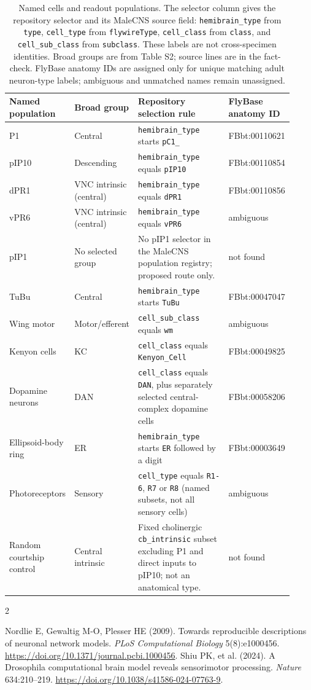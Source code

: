 \documentclass[11pt]{article}
\begin{document}
\clearpage
\begin{table}[htbp]
\caption{Named cells and readout populations. The selector column gives the repository selector and its MaleCNS source field: \texttt{hemibrain\_type} from \texttt{type}, \texttt{cell\_type} from \texttt{flywireType}, \texttt{cell\_class} from \texttt{class}, and \texttt{cell\_sub\_class} from \texttt{subclass}. These labels are not cross-specimen identities. Broad groups are from Table S2; source lines are in the fact-check. FlyBase anatomy IDs are assigned only for unique matching adult neuron-type labels; ambiguous and unmatched names remain unassigned.}
\small\begin{tabular}{@{}p{0.17\linewidth}p{0.22\linewidth}p{0.38\linewidth}p{0.15\linewidth}@{}}\toprule
Named population & Broad group & Repository selection rule & FlyBase anatomy ID \\ \midrule
P1 & Central & \texttt{hemibrain\_type} starts \texttt{pC1\_} & FBbt:00110621 \\
pIP10 & Descending & \texttt{hemibrain\_type} equals \texttt{pIP10} & FBbt:00110854 \\
dPR1 & VNC intrinsic (central) & \texttt{hemibrain\_type} equals \texttt{dPR1} & FBbt:00110856 \\
vPR6 & VNC intrinsic (central) & \texttt{hemibrain\_type} equals \texttt{vPR6} & ambiguous \\
pIP1 & No selected group & No pIP1 selector in the MaleCNS population registry; proposed route only. & not found \\
TuBu & Central & \texttt{hemibrain\_type} starts \texttt{TuBu} & FBbt:00047047 \\
Wing motor & Motor/efferent & \texttt{cell\_sub\_class} equals \texttt{wm} & ambiguous \\
Kenyon cells & KC & \texttt{cell\_class} equals \texttt{Kenyon\_Cell} & FBbt:00049825 \\
Dopamine neurons & DAN & \texttt{cell\_class} equals \texttt{DAN}, plus separately selected central-complex dopamine cells & FBbt:00058206 \\
Ellipsoid-body ring & ER & \texttt{hemibrain\_type} starts \texttt{ER} followed by a digit & FBbt:00003649 \\
Photoreceptors & Sensory & \texttt{cell\_type} equals \texttt{R1-6}, \texttt{R7} or \texttt{R8} (named subsets, not all sensory cells) & ambiguous \\
Random courtship control & Central intrinsic & Fixed cholinergic \texttt{cb\_intrinsic} subset excluding P1 and direct inputs to pIP10; not an anatomical type. & not found \\
\bottomrule\end{tabular}
\end{table}
\begin{thebibliography}{2}\raggedright
{} Nordlie E, Gewaltig M-O, Plesser HE (2009). Towards reproducible descriptions of neuronal network models. \textit{PLoS Computational Biology} 5(8):e1000456. \url{https://doi.org/10.1371/journal.pcbi.1000456}.
 Shiu PK, et al. (2024). A Drosophila computational brain model reveals sensorimotor processing. \textit{Nature} 634:210--219. \url{https://doi.org/10.1038/s41586-024-07763-9}.
\end{thebibliography}
\end{document}
